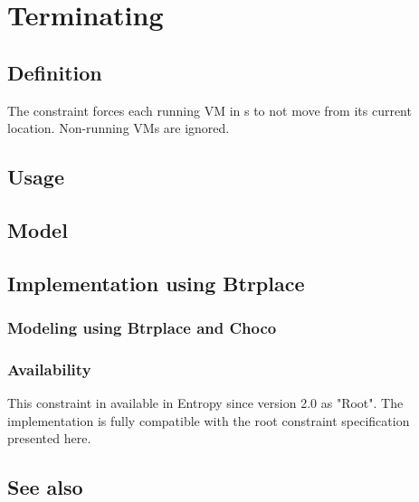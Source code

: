 \section{Terminating}

\subsection{Definition}

The  constraint forces each running VM in s to not move from its current location. Non-running
VMs are ignored.

\subsection{Usage}

\subsection{Model}

\subsection{Implementation using Btrplace}

\subsubsection{Modeling using Btrplace and Choco}

\subsubsection{Availability}

This constraint in available in Entropy since version 2.0 as "Root". The implementation
is fully compatible with the root constraint specification presented here.

\subsection{See also}
